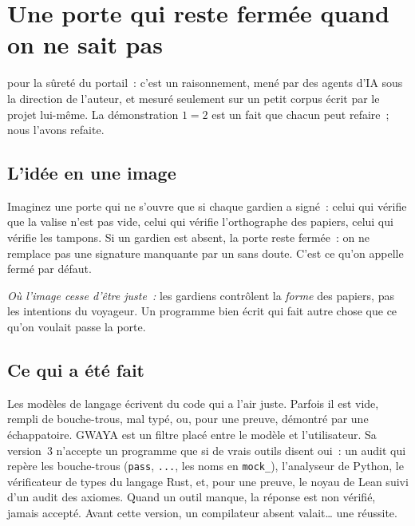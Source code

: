 \chapter[Une porte fermée par défaut]{Une porte qui reste fermée quand on ne sait pas}

\noindent{} pour la sûreté du portail~: c'est un raisonnement, mené par des agents d'IA sous la direction de
l'auteur, et mesuré seulement sur un petit corpus écrit par le projet lui-même. La démonstration \og $1=2$\fg{} est un fait que chacun peut refaire~; nous l'avons
refaite.

\section*{L'idée en une image}

\begin{analogie}
Imaginez une porte qui ne s'ouvre que si chaque gardien a signé~: celui qui vérifie que la valise n'est pas vide,
celui qui vérifie l'orthographe des papiers, celui qui vérifie les tampons. Si un gardien est absent, la porte
reste fermée~: on ne remplace pas une signature manquante par un \og sans doute\fg. C'est ce qu'on appelle
\og fermé par défaut\fg.

\emph{Où l'image cesse d'être juste~:} les gardiens contrôlent la \emph{forme} des papiers, pas les intentions du
voyageur. Un programme bien écrit qui fait autre chose que ce qu'on voulait passe la porte.
\end{analogie}

\section*{Ce qui a été fait}

Les modèles de langage écrivent du code qui a l'air juste. Parfois il est vide, rempli de bouche-trous, mal typé, ou,
pour une preuve, \og démontré\fg{} par une échappatoire. GWAYA est un filtre placé entre le modèle et l'utilisateur.
Sa version~3 n'accepte un programme que si de vrais outils disent oui~: un audit qui repère les bouche-trous
(\texttt{pass}, \texttt{...}, les noms en \texttt{mock\_}), l'analyseur de Python, le vérificateur de types du langage
Rust, et, pour une preuve, le noyau de Lean suivi d'un audit des axiomes. Quand un outil manque, la réponse est
\og non vérifié\fg, jamais \og accepté\fg. Avant cette version, un compilateur absent valait\ldots{} une réussite.

